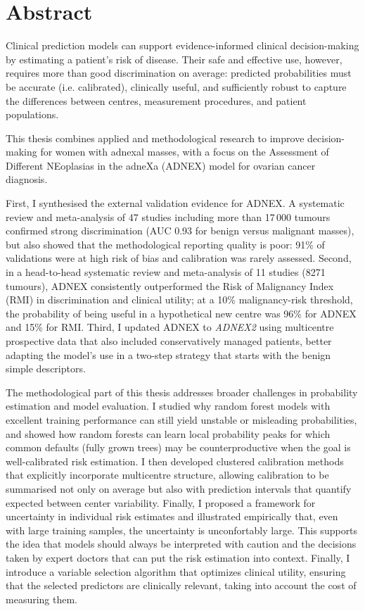 \chapter*{Abstract}


Clinical prediction models can support evidence-informed clinical decision-making by estimating a patient's risk of disease. Their safe and effective use, however, requires more than good discrimination on average: predicted probabilities must be accurate (i.e. calibrated), clinically useful, and sufficiently robust to capture the differences between centres, measurement procedures, and patient populations.

This thesis combines applied and methodological research to improve decision-making for women with adnexal masses, with a focus on the Assessment of Different NEoplasias in the adneXa (\gls{ADNEX}) model for ovarian cancer diagnosis.

First, I synthesised the external validation evidence for \gls{ADNEX}. A systematic review and meta-analysis of 47 studies including more than 17\,000 tumours confirmed strong discrimination (AUC 0.93 for benign versus malignant masses), but also showed that the methodological reporting quality is poor: 91\% of validations were at high risk of bias and calibration was rarely assessed. Second, in a head-to-head systematic review and meta-analysis of 11 studies (8271 tumours), \gls{ADNEX} consistently outperformed the Risk of Malignancy Index (\gls{RMI}) in discrimination and clinical utility; at a 10\% malignancy-risk threshold, the probability of being useful in a hypothetical new centre was 96\% for \gls{ADNEX} and 15\% for \gls{RMI}. Third, I updated \gls{ADNEX} to \emph{ADNEX2} using multicentre prospective data that also included conservatively managed patients, better adapting the model's use in a two-step strategy that starts with the benign simple descriptors. 

The methodological part of this thesis addresses broader challenges in probability estimation and model evaluation. I studied why random forest models with excellent training performance can still yield unstable or misleading probabilities, and showed how random forests can learn local probability peaks for which common defaults (fully grown trees) may be counterproductive when the goal is well-calibrated risk estimation. I then developed clustered calibration methods that explicitly incorporate multicentre structure, allowing calibration to be summarised not only on average but also with prediction intervals that quantify expected between center variability. Finally, I proposed a framework for uncertainty in individual risk estimates and illustrated empirically that, even with large training samples, the uncertainty is unconfortably large. This supports the idea that models should always be interpreted with caution and the decisions taken by expert doctors that can put the risk estimation into context. Finally, I introduce a variable selection algorithm that optimizes clinical utility, ensuring that the selected predictors are clinically relevant, taking into account the cost of measuring them.

